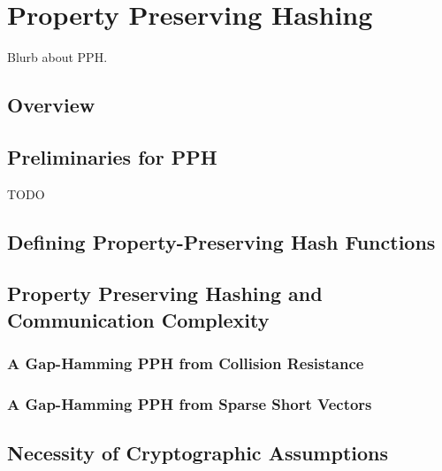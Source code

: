 
\chapter{Property Preserving Hashing}
Blurb about PPH.

\section{Overview}\label{sec:pph-intro}


\section{Preliminaries for PPH}
TODO

\section{Defining Property-Preserving Hash Functions}
\label{sec:pph-definitions}\label{sec:pph-defs}




\section{Property Preserving Hashing and Communication Complexity}\label{sec:owc-relations}



\subsection{A Gap-Hamming PPH from Collision Resistance}\label{sec:construction1}


\subsection{A Gap-Hamming PPH from Sparse Short Vectors}
\label{sec:ham}


\section{Necessity of Cryptographic Assumptions}\label{sec:lb}



